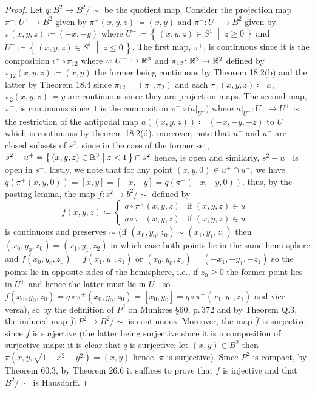 \begin{proof}
Let $q\colon B^2\to B^2/{\sim}$ be the quotient map. Consider the
projection map $\pi^+\colon U^+\to B^2$ given by
$\pi^+(x,y,z)\coloneqq(x,y)$ and $\pi^-\colon U^-\to B^2$ given by
$\pi(x,y,z)\coloneqq(-x,-y)$ where $U^+\coloneqq\left\{\,(x,y,z)\in
  S^1\;\middle|\;z\geq 0\,\right\}$ and $U^-\coloneqq\left\{\,(x,y,z)\in
  S^1\;\middle|\;z\leq 0\,\right\}$. The first map, $\pi^+$, is continuous
since it is the composition $\iota^+\circ\pi_{12}$ where $\iota\colon
U^+\hookrightarrow\mathbb{R}^3$ and $\pi_{12}\colon\mathbb{R}^3\to\mathbb{R}^2$ defined by
$\pi_{12}(x,y,z)\coloneqq(x,y)$ the former being continuous by Theorem
18.2(b) and the latter by Theorem 18.4 since $\pi_{12}=(\pi_1,\pi_2)$ and
each $\pi_1(x,y,z)\coloneqq x$, $\pi_2(x,y,z)\coloneqq y$ are continuous
since they are projection maps. The second map, $\pi^-$, is continuous
since it is the composition $\pi^+\circ\bigl(\left.a\right|_{U^-}\bigr)$
where $\left.a\right|_{U^-}\colon U^-\to U^+$ is the restriction of the
antipodal map $a((x,y,z))\coloneqq(-x,-y,-z)$ to $U^-$ which is continuous
by theorem 18.2(d). moreover, note that $u^+$ and $u^-$ are closed subsets
of $s^2$, since in the case of the former set,
$s^2-u^+=\left\{\,(x,y,z)\in\mathbb{R}^3\;\middle|\;z<1\,\right\}\cap s^2$ hence,
is open and similarly, $s^2-u^-$ is open in $s^-$. lastly, we note that for
any point $(x,y,0)\in u^+\cap u^-$, we have
$q(\pi^+(x,y,0))=[x,y]=[-x,-y]=q(\pi^-(-x,-y,0))$. thus, by the pasting
lemma, the map $f\colon s^2\to b^2/{\sim}$ defined by
\[
f(x,y,z)\coloneqq
\begin{cases}
q\circ\pi^+(x,y,z)&\text{if $(x,y,z)\in u^+$}\\
q\circ\pi^-(x,y,z)&\text{if $(x,y,z)\in u^-$}
\end{cases}
\]
is continuous and preserves $\sim$ (if $(x_0,y_0,z_0)\sim (x_1,y_1,z_1)$
then $(x_0,y_0,z_0)=(x_1,y_1,z_2)$ in which case both points lie in the
same hemi-sphere and $f(x_0,y_0,z_0)=f(x_1,y_1,z_1)$ or
$(x_0,y_0,z_0)=(-x_1,-y_1,-z_1)$ so the points lie in opposite sides of the
hemisphere, i.e., if $z_0\geq 0$ the former point lies in $U^+$ and hence
the latter must lie in $U^-$  so
$f(x_0,y_0,z_0)=q\circ\pi^+(x_0,y_0,z_0)=[x_0,y_0]=q\circ\pi^+(x_1,y_1,z_1)$
and vice-versa), so by the definition of $P^2$ on Munkres \S60, p.\,372 and
by Theorem Q.3, the induced map $\bar f\colon P^2\to B^2/{\sim}$ is
continuous. Moreover, the map $\bar f$ is surjective since $f$ is
surjective (the latter being surjective since it is a composition of
surjective maps: it is clear that $q$ is surjective; let $(x,y)\in B^2$
then $\pi(x,y,\sqrt{1-x^2-y^2})=(x,y)$ hence, $\pi$ is surjective). Since
$P^2$ is compact, by Theorem 60.3, by Theorem 26.6 it suffices to prove
that $\bar f$ is injective and that $B^2/{\sim}$ is Hausdorff.


\end{proof}
